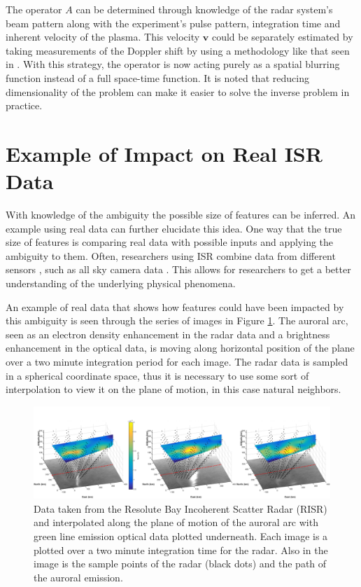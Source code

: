 The operator $A$ can be determined through knowledge of the radar system's beam pattern along with the experiment's pulse pattern, integration time and inherent velocity of the plasma. This velocity $\mathbf{v}$ could be separately estimated by taking measurements of the Doppler shift by using a methodology like that seen in \cite{butler:imagingfregiondrifts}. With this strategy, the operator is now acting purely as a spatial blurring function instead of a full space-time function. It is noted that reducing dimensionality of the problem can make it easier to solve the inverse problem in practice.

\section{Example of Impact on Real ISR Data}

With knowledge of the ambiguity the possible size of features can be inferred. An example using real data can further elucidate this idea. One way that the true size of features is comparing real data with possible inputs and applying the ambiguity to them. Often, researchers using ISR combine data from different sensors \cite{Dahlgren:2012dq}, such as all sky camera data \cite{Shiokawa1999,GRL:GRL21871,Shiokawa2009}. This allows for researchers to get a better understanding of the underlying physical phenomena.

An example of real data that shows how features could have been impacted by this ambiguity is seen through the series of images in Figure \ref{fig:realdataplane3points}. The auroral arc, seen as an electron density enhancement in the radar data and a brightness enhancement in the optical data, is moving along horizontal position of the plane over a two minute integration period for each image. The radar data is sampled in a spherical coordinate space, thus it is necessary to use some sort of interpolation to view it on the plane of motion, in this case natural neighbors. 

\begin{figure}[h!]
	\centering
	\includegraphics[width=6in]{radarwithoptical}
	\caption{Data taken from the Resolute Bay Incoherent Scatter Radar (RISR) and interpolated along the plane of motion of the auroral arc with green line emission optical data plotted underneath. Each image is a plotted over a two minute integration time for the radar. Also in the image is the sample points of the radar (black dots) and the path of the auroral emission. }
	\label{fig:realdataplane3points}
\end{figure}

